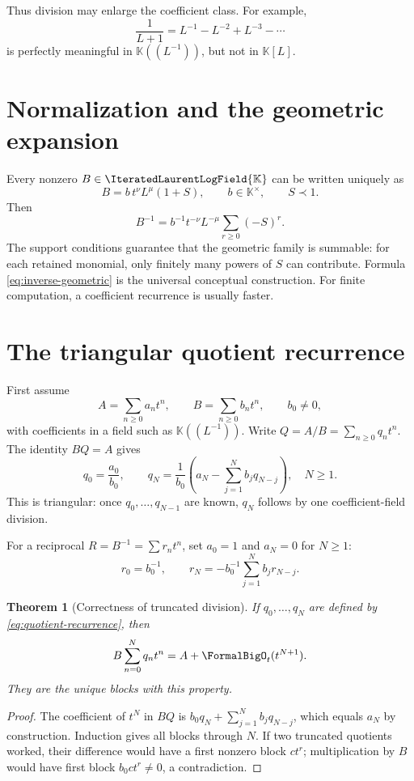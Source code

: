 \documentclass[11pt,oneside]{book}
\newtheorem{theorem}{Theorem}[chapter]
\theoremstyle{definition}
\theoremstyle{remark}
\newcommand{\K}{\mathbb K}
\newcommand{\PLfield}{\IteratedLaurentLogField{\K}}
\newcommand{\precdom}{\prec}
\begin{document}
Thus division may enlarge the coefficient class.  For example,
\[
 \frac1{L+1}=L^{-1}-L^{-2}+L^{-3}-\cdots
\]
is perfectly meaningful in $\K((L^{-1}))$, but not in $\K[L]$.

\section{Normalization and the geometric expansion}
Every nonzero $B\in\PLfield$ can be written uniquely as
\begin{equation}\label{eq:division-normalization}
 B=b\,t^\nu L^\mu(1+S),
 \qquad b\in\K^\times,
 \qquad S\precdom1.
\end{equation}
Then
\begin{equation}\label{eq:inverse-geometric}
 B^{-1}=b^{-1}t^{-\nu}L^{-\mu}
 \sum_{r\ge0}(-S)^r.
\end{equation}
The support conditions guarantee that the geometric family is summable: for
each retained monomial, only finitely many powers of $S$ can contribute.
Formula \eqref{eq:inverse-geometric} is the universal conceptual construction.
For finite computation, a coefficient recurrence is usually faster.

\section{The triangular quotient recurrence}
First assume
\begin{equation}\label{eq:quotient-normalized}
 A=\sum_{n\ge0}a_n t^n,
 \qquad
 B=\sum_{n\ge0}b_n t^n,
 \qquad b_0\ne0,
\end{equation}
with coefficients in a field such as $\K((L^{-1}))$.  Write
$Q=A/B=\sum_{n\ge0}q_nt^n$.  The identity $BQ=A$ gives
\begin{equation}\label{eq:quotient-recurrence}
 q_0=\frac{a_0}{b_0},
 \qquad
 q_N=\frac{1}{b_0}
 \left(a_N-\sum_{j=1}^{N}b_jq_{N-j}\right),
 \quad N\ge1.
\end{equation}
This is triangular: once $q_0,\ldots,q_{N-1}$ are known, $q_N$ follows by one
coefficient-field division.

For a reciprocal $R=B^{-1}=\sum r_nt^n$, set $a_0=1$ and $a_N=0$ for
$N\ge1$:
\begin{equation}\label{eq:reciprocal-recurrence}
 r_0=b_0^{-1},
 \qquad
 r_N=-b_0^{-1}\sum_{j=1}^{N}b_jr_{N-j}.
\end{equation}

\begin{theorem}[Correctness of truncated division]\label{thm:division-correct}
If $q_0,\ldots,q_N$ are defined by \eqref{eq:quotient-recurrence}, then
\[
 B\sum_{n=0}^{N}q_nt^n
 =A+\FormalBigO_t(t^{N+1}).
\]
They are the unique blocks with this property.
\end{theorem}
\begin{proof}
The coefficient of $t^N$ in $BQ$ is
$b_0q_N+\sum_{j=1}^Nb_jq_{N-j}$, which equals $a_N$ by construction.
Induction gives all blocks through $N$.  If two truncated quotients worked,
their difference would have a first nonzero block $ct^r$; multiplication by
$B$ would have first block $b_0ct^r\ne0$, a contradiction.
\end{proof}
\end{document}
